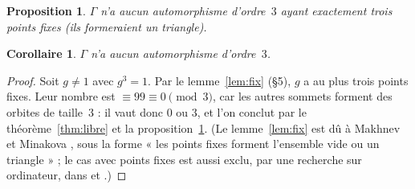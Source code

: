 \documentclass[11pt,a4paper]{article}
\newtheorem{proposition}[theorem]{Proposition}
\newtheorem{corollary}[theorem]{Corollaire}
\theoremstyle{remark}
\begin{document}
\begin{proposition}\label{prop:triangle}
$\Gamma$ n'a aucun automorphisme d'ordre~$3$ ayant exactement trois points fixes (ils formeraient un triangle).
\end{proposition}

\begin{corollary}\label{cor:tout}
$\Gamma$ n'a aucun automorphisme d'ordre~$3$.
\end{corollary}
\begin{proof}
Soit $g\ne1$ avec $g^3=1$. Par le lemme~\ref{lem:fix} (§5), $g$ a au plus trois points fixes. Leur nombre est
$\equiv 99\equiv0\pmod3$, car les autres sommets forment des orbites de taille~3 : il vaut donc $0$ ou $3$, et l'on conclut par le
théorème~\ref{thm:libre} et la proposition~\ref{prop:triangle}. (Le lemme~\ref{lem:fix} est dû à Makhnev et Minakova \cite{MM04},
sous la forme « les points fixes forment l'ensemble vide ou un triangle » ; le cas avec points fixes est aussi exclu, par une
recherche sur ordinateur, dans \cite[th.~4.14]{B09} et \cite{BL11}.)
\end{proof}
\end{document}
